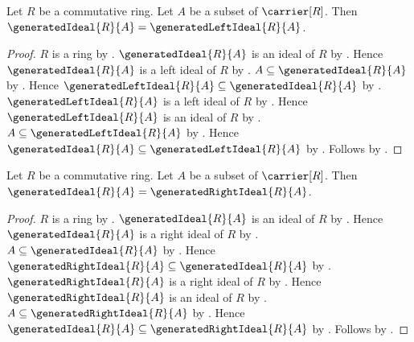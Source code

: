 \begin{theorem}\label{commutative_generated_ideal_eq_generated_left_ideal}
    Let $R$ be a commutative ring.
    Let $A$ be a subset of $\carrier[R]$.
    Then $\generatedIdeal{R}{A}=\generatedLeftIdeal{R}{A}$.
\end{theorem}
\begin{proof}
    $R$ is a ring by .
    $\generatedIdeal{R}{A}$ is an ideal of $R$ by
        .
    Hence $\generatedIdeal{R}{A}$ is a left ideal of $R$ by
        .
    $A\subseteq\generatedIdeal{R}{A}$ by
        .
    Hence $\generatedLeftIdeal{R}{A}\subseteq
        \generatedIdeal{R}{A}$ by .
    $\generatedLeftIdeal{R}{A}$ is a left ideal of $R$ by
        .
    Hence $\generatedLeftIdeal{R}{A}$ is an ideal of $R$ by
        .
    $A\subseteq\generatedLeftIdeal{R}{A}$ by
        .
    Hence $\generatedIdeal{R}{A}\subseteq
        \generatedLeftIdeal{R}{A}$ by .
    Follows by .
\end{proof}

\begin{theorem}\label{commutative_generated_ideal_eq_generated_right_ideal}
    Let $R$ be a commutative ring.
    Let $A$ be a subset of $\carrier[R]$.
    Then $\generatedIdeal{R}{A}=\generatedRightIdeal{R}{A}$.
\end{theorem}
\begin{proof}
    $R$ is a ring by .
    $\generatedIdeal{R}{A}$ is an ideal of $R$ by
        .
    Hence $\generatedIdeal{R}{A}$ is a right ideal of $R$ by
        .
    $A\subseteq\generatedIdeal{R}{A}$ by
        .
    Hence $\generatedRightIdeal{R}{A}\subseteq
        \generatedIdeal{R}{A}$ by .
    $\generatedRightIdeal{R}{A}$ is a right ideal of $R$ by
        .
    Hence $\generatedRightIdeal{R}{A}$ is an ideal of $R$ by
        .
    $A\subseteq\generatedRightIdeal{R}{A}$ by
        .
    Hence $\generatedIdeal{R}{A}\subseteq
        \generatedRightIdeal{R}{A}$ by .
    Follows by .
\end{proof}

